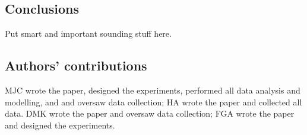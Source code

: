 \documentclass[doc, floatsintext]{apa7}
\begin{document}
\subsection{Conclusions}
Put smart and important sounding stuff here.

\subsection{Authors' contributions}
MJC wrote the paper, designed the experiments, performed all data analysis and modelling, and and oversaw data collection;
HA wrote the paper and collected all data.
DMK wrote the paper and oversaw data collection;
FGA wrote the paper and designed the experiments.

\printbibliography
\end{document}
